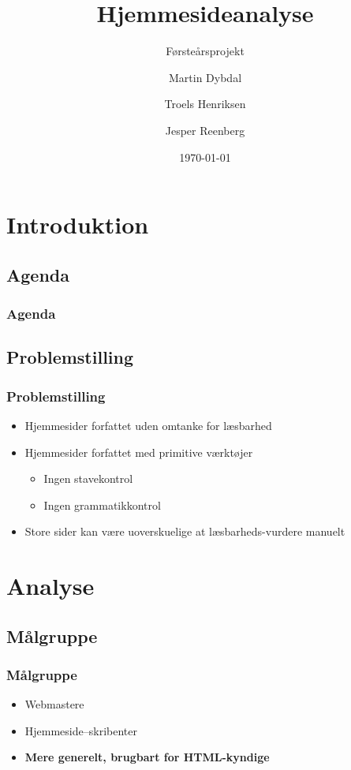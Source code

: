 \documentclass{beamer}
\title{Hjemmesideanalyse}
\subtitle{Førsteårsprojekt}
\author{Martin Dybdal \and Troels Henriksen \and Jesper Reenberg}
\institute{\textrm{Datalogisk Institut, Københavns Universitet}}
\date{\today}
\begin{document}
\frame{\titlepage}


\section{Introduktion}
\subsection{Agenda}
\begin{frame}
  \frametitle{Agenda}
  \tableofcontents
\end{frame}

\subsection{Problemstilling}
\begin{frame}
  \frametitle{Problemstilling}

  \begin{itemize}
  \item<1-> Hjemmesider forfattet uden omtanke for læsbarhed
  \item<2-> Hjemmesider forfattet med primitive værktøjer
    \begin{itemize}
      \item<2-> Ingen stavekontrol
      \item<2-> Ingen grammatikkontrol
    \end{itemize}
  \item<3-> Store sider kan være uoverskuelige at læsbarheds-vurdere manuelt
  \end{itemize}
\end{frame}

\section{Analyse} %
\subsection{Målgruppe}
\begin{frame}
  \frametitle{Målgruppe}
  \begin{itemize}
  \item<1-> Webmastere
  \item<2-> Hjemmeside--skribenter
  \item<3-> \textbf{Mere generelt, brugbart for HTML-kyndige}
  \end{itemize}

\end{frame}
\end{document}
